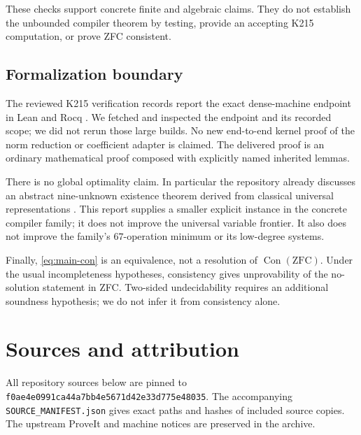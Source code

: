 \documentclass[11pt]{article}
\theoremstyle{remark}\newtheorem{remark}[theorem]{Remark}
\newcommand{\Con}{\operatorname{Con}}
\newcommand{\pin}{\texttt{f0ae4e0991ca44a7bb4e5671d42e33d775e48035}}
\begin{document}
These checks support concrete finite and algebraic claims.
They do not establish the unbounded compiler theorem by testing,
provide an accepting K215 computation, or prove ZFC consistent.

\subsection{Formalization boundary}

The reviewed K215 verification records report the exact dense-machine
endpoint in Lean and Rocq \cite{endpoint}. We fetched and inspected the endpoint and
its recorded scope; we did not rerun those large builds.
No new end-to-end kernel proof of the norm reduction or coefficient
adapter is claimed. The delivered proof is an ordinary mathematical
proof composed with explicitly named inherited lemmas.

There is no global optimality claim. In particular the repository
already discusses an abstract nine-unknown existence theorem derived
from classical universal representations \cite{repo}. This report supplies a
smaller explicit instance in the concrete compiler family; it does
not improve the universal variable frontier. It also does not improve
the family's \(67\)-operation minimum or its low-degree systems.

Finally, \eqref{eq:main-con} is an equivalence, not a resolution of
\(\Con(\mathrm{ZFC})\). Under the usual incompleteness hypotheses,
consistency gives unprovability of the no-solution statement in ZFC.
Two-sided undecidability requires an additional soundness hypothesis;
we do not infer it from consistency alone.

\section*{Sources and attribution}

All repository sources below are pinned to \pin. The accompanying
\texttt{SOURCE\_MANIFEST.json} gives exact paths and hashes of included
source copies. The upstream ProveIt and machine notices are preserved
in the archive.
\end{document}
